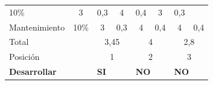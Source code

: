 \begin{table}[H]
{\begin{tabular}{p{5.355em}cp{5.355em}cp{5.355em}cp{5.355em}c}
		10\% &
		\multicolumn{1}{c}{3} &
		0,3 &
		\multicolumn{1}{c}{4} &
		0,4 &
		\multicolumn{1}{c}{3} &
		0,3
		\\
		Mantenimiento &
		10\% &
		\multicolumn{1}{c}{3} &
		0,3 &
		\multicolumn{1}{c}{4} &
		0,4 &
		\multicolumn{1}{c}{4} &
		0,4
		\\
		Total &
		&
		\multicolumn{2}{c}{3,45} &
		\multicolumn{2}{c}{4} &
		\multicolumn{2}{c}{2,8}
		\\
		Posición &
		&
		\multicolumn{2}{c}{1} &
		\multicolumn{2}{c}{2} &
		\multicolumn{2}{c}{3}
		\\
		\hline
		\textbf{Desarrollar} &
		&
		\multicolumn{2}{p{10.71em}}{\textbf{SI}} &
		\multicolumn{2}{p{10.71em}}{\textbf{NO}} &
		\multicolumn{2}{p{10.71em}}{\textbf{NO}}
		\\
		\hline
	\end{tabular}}%
	\label{tab:addlabel}%
\end{table}%

